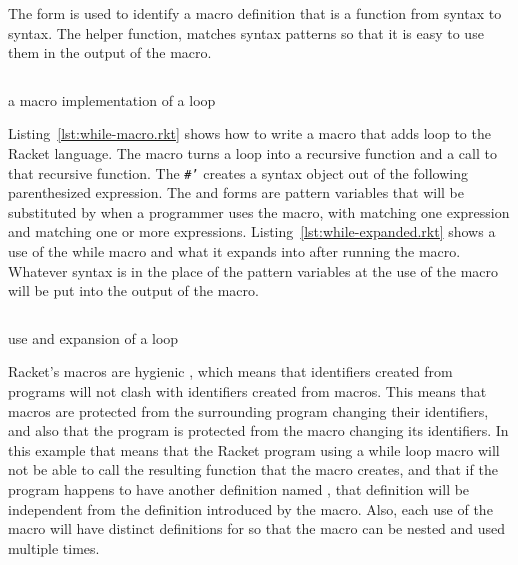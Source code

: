 The  form is used to identify a macro definition that is a function from syntax to syntax.
The helper function,  matches syntax patterns so that it is easy to use them in the output of the macro.

\begin{listing}[tb]
  \inputminted{racket}{listings/while-macro.rkt}
  \caption{a macro implementation of a  loop}
  \label{lst:while-macro.rkt}
\end{listing}
Listing~\ref{lst:while-macro.rkt} shows how to write a macro that adds  loop to the Racket language. 
The macro turns a  loop into a recursive function and a call to that recursive function.
The \texttt{#'} creates a syntax object out of the following parenthesized expression. 
The  and  forms are pattern variables that will be substituted by  when a programmer uses the macro, with  matching one expression and  matching one or more expressions.
Listing~\ref{lst:while-expanded.rkt} shows a use of the while macro and what it expands into after running the macro. 
Whatever syntax is in the place of the pattern variables at the use of the macro will be put into the output of the macro.
\begin{listing}[tb]
  \inputminted{racket}{listings/while-expanded.rkt}
  \caption{use and expansion of a  loop}
  \label{lst:while-expanded.rkt}
\end{listing}

Racket's macros are hygienic \cite{hygiene}, which means that identifiers created from programs will not clash with identifiers created from macros. 
This means that macros are protected from the surrounding program changing their identifiers, and also that the program is protected from the macro changing its identifiers.
In this example that means that the Racket program using a while loop macro will not be able to call the resulting  function that the macro creates, and that if the program happens to have another definition named , that definition will be independent from the definition introduced by the macro.
Also, each use of the macro will have distinct definitions for  so that the macro can be nested and used multiple times.

